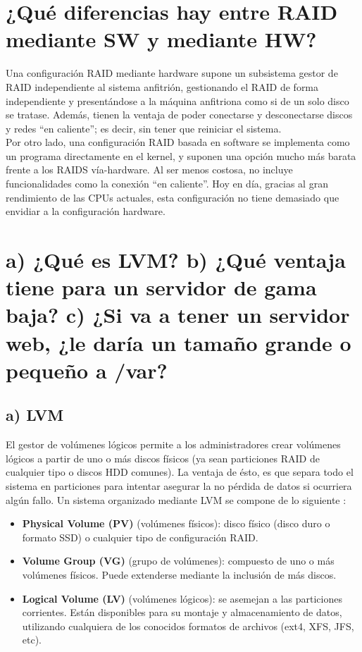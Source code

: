 \section{¿Qué diferencias hay entre RAID mediante SW y mediante HW?}

Una configuración RAID mediante hardware supone un subsistema gestor de RAID independiente al sistema anfitrión, gestionando el RAID de forma
independiente y presentándose a la máquina anfitriona como si de un solo disco se tratase. Además, tienen la ventaja de poder conectarse y desconectarse
discos y redes ``en caliente''; es decir, sin tener que reiniciar el sistema. \\
Por otro lado, una configuración RAID basada en software se implementa como un programa directamente en el kernel, y suponen una opción mucho más barata
frente a los RAIDS vía-hardware. Al ser menos costosa, no incluye funcionalidades como la conexión ``en caliente''. Hoy en día, gracias al gran rendimiento
de las CPUs actuales, esta configuración no tiene demasiado que envidiar a la configuración hardware.
\cite{raidSW-HW}

\section{a) ¿Qué es LVM? b) ¿Qué ventaja tiene para un servidor de gama baja? c) ¿Si va a tener un servidor web, ¿le daría un
tamaño grande o pequeño a /var?}

\subsection{a) LVM}
El gestor de volúmenes lógicos permite a los administradores crear volúmenes lógicos a partir de uno o más discos físicos (ya
sean particiones RAID de cualquier tipo o discos HDD comunes). La ventaja de ésto, es que separa todo el sistema en particiones
para intentar asegurar la no pérdida de datos si ocurriera algún fallo. Un sistema organizado mediante LVM se compone de lo siguiente \cite{ubuntu-lvm}:
\begin{itemize}
	\item \textbf{Physical Volume (PV)} (volúmenes físicos): disco físico (disco duro o formato SSD) o cualquier tipo de configuración RAID.
	\item \textbf{Volume Group (VG)} (grupo de volúmenes): compuesto de uno o más volúmenes físicos. Puede extenderse mediante la inclusión
	de más discos.
	\item \textbf{Logical Volume (LV)} (volúmenes lógicos): se asemejan a las particiones corrientes. Están disponibles para su montaje y
	almacenamiento de datos, utilizando cualquiera de los conocidos formatos de archivos (ext4, XFS, JFS, etc).
\end{itemize}


